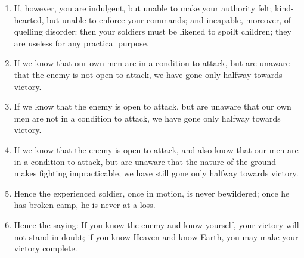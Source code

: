 \begin{enumerate}
  \item If, however, you are indulgent, but unable to make your
    authority felt; kind-hearted, but unable to enforce your commands;
    and incapable, moreover, of quelling disorder: then your soldiers
    must be likened to spoilt children; they are useless for any
    practical purpose.

  \item If we know that our own men are in a condition to attack, but
    are unaware that the enemy is not open to attack, we have gone
    only halfway towards victory.

  \item If we know that the enemy is open to attack, but are unaware
    that our own men are not in a condition to attack, we have gone
    only halfway towards victory.

  \item If we know that the enemy is open to attack, and also know
    that our men are in a condition to attack, but are unaware that
    the nature of the ground makes fighting impracticable, we have
    still gone only halfway towards victory.

  \item Hence the experienced soldier, once in motion, is never
    bewildered; once he has broken camp, he is never at a loss.

  \item Hence the saying: If you know the enemy and know yourself,
    your victory will not stand in doubt; if you know Heaven and know
    Earth, you may make your victory complete.

  \end{enumerate}

